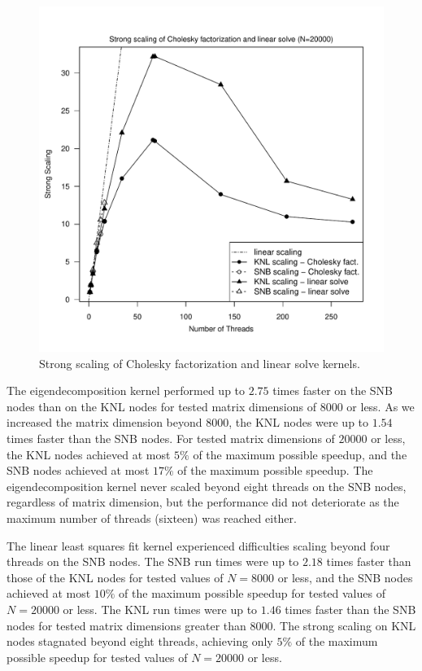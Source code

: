 \begin{figure}
\includegraphics[height=\columnwidth, width=\columnwidth]{chol_solve_20000_272-ss.pdf}
\caption{Strong scaling of Cholesky factorization and linear solve kernels.}
\label{fig:cholSolveScale}
\end{figure}

The eigendecomposition kernel performed up to $2.75$ times faster on
  the SNB nodes than on the KNL nodes for tested matrix dimensions of $8000$ or
  less.
As we increased the matrix dimension beyond $8000$, the KNL nodes
  were up to $1.54$ times faster than the SNB nodes.
For tested matrix dimensions of $20000$ or less, the KNL nodes
  achieved at most $5\%$ of the maximum possible speedup, and the SNB
  nodes achieved at most $17\%$ of the maximum possible speedup.
The eigendecomposition kernel never scaled beyond eight threads on the SNB
  nodes, regardless of matrix dimension, but the performance did not deteriorate
  as the maximum number of threads (sixteen) was reached either.

The linear least squares fit kernel experienced difficulties scaling beyond
  four threads on the SNB nodes.
The SNB run times were up to $2.18$ times faster than those of the
  KNL nodes for tested values of $N=8000$ or less, and the SNB nodes achieved at
  most $10\%$ of the maximum possible speedup for tested values of $N=20000$ or
  less.
The KNL run times were up to $1.46$ times faster than the SNB nodes for tested
  matrix dimensions greater than $8000$.
The strong scaling on KNL nodes stagnated beyond eight threads, achieving
  only $5\%$ of the maximum possible speedup for tested values of $N=20000$ or
  less.

